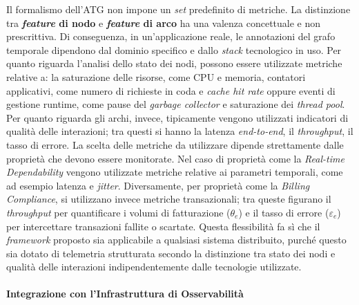 Il formalismo dell'\gls{ATG} non impone un \textit{set} predefinito di metriche. La distinzione
tra \textbf{\textit{feature} di nodo} e \textbf{\textit{feature} di arco} ha una valenza
concettuale e non prescrittiva. Di conseguenza, in un'applicazione reale, le annotazioni del grafo
temporale dipendono dal dominio specifico e dallo \textit{stack} tecnologico in uso. Per quanto
riguarda l'analisi dello stato dei nodi, possono essere utilizzate metriche relative a: la
saturazione delle risorse, come \gls{CPU} e memoria, contatori applicativi, come numero di
richieste in coda e \textit{cache hit rate} oppure eventi di gestione runtime, come pause del
\textit{garbage collector} e saturazione dei \textit{thread pool}. Per quanto riguarda gli archi,
invece, tipicamente vengono utilizzati indicatori di qualità delle interazioni; tra questi si hanno
la latenza \textit{end-to-end}, il \textit{throughput}, il tasso di errore.
La scelta delle metriche da utilizzare dipende strettamente dalle proprietà che devono essere
monitorate. Nel caso di proprietà come la \textit{Real-time Dependability} vengono utilizzate
metriche relative ai parametri temporali, come ad esempio latenza e \textit{jitter}. Diversamente,
per proprietà come la \textit{Billing Compliance}, si utilizzano invece metriche transazionali;
tra queste figurano il \textit{throughput} per quantificare i volumi di fatturazione ($\theta_e$)
e il tasso di errore ($\varepsilon_e$) per intercettare transazioni fallite o scartate. Questa
flessibilità fa sì che il \textit{framework} proposto sia applicabile a qualsiasi sistema
distribuito, purché questo sia dotato di telemetria strutturata secondo la distinzione tra stato
dei nodi e qualità delle interazioni indipendentemente dalle tecnologie utilizzate.

\paragraph{Integrazione con l'Infrastruttura di Osservabilità}
\label{sec:integrazione_infrastruttura}

